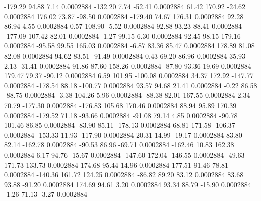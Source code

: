      -179.29       94.88        7.14     0.0002884
     -132.20        7.74      -52.41     0.0002884
       61.42      170.92      -24.62     0.0002884
      176.02       73.87      -98.50     0.0002884
     -179.40       74.67      176.31     0.0002884
       92.28       86.94        4.55     0.0002884
        0.57      108.90       -5.52     0.0002884
       92.88       93.23       88.41     0.0002884
     -177.09      107.42       82.01     0.0002884
       -1.27       99.15        6.30     0.0002884
       92.45       98.15      179.16     0.0002884
      -95.58       99.55      165.03     0.0002884
       -6.87       83.36       85.47     0.0002884
      178.89       81.08       82.08     0.0002884
       94.62       83.51      -91.49     0.0002884
        0.43       69.20       86.96     0.0002884
       35.93        2.13      -31.41     0.0002884
       91.86       87.60      158.26     0.0002884
      -87.80       93.36       19.69     0.0002884
      179.47       79.37      -90.12     0.0002884
        6.59      101.95     -100.08     0.0002884
       34.37      172.92     -147.77     0.0002884
     -178.54       88.18     -100.77     0.0002884
       93.57       94.68       21.41     0.0002884
       -0.22       86.58      -88.75     0.0002884
       -3.38      104.26        5.96     0.0002884
      -88.38       82.01      167.55     0.0002884
        2.34       70.79     -177.30     0.0002884
     -176.83      105.68      170.46     0.0002884
       88.94       95.89      170.39     0.0002884
     -179.52       71.18      -93.66     0.0002884
      -91.08       79.14        4.85     0.0002884
      -90.78      101.46       86.85     0.0002884
      -83.90       85.11     -178.13     0.0002884
       68.81      171.58     -106.37     0.0002884
     -153.33       11.93     -117.90     0.0002884
       20.31       14.99      -19.17     0.0002884
       83.80       82.14     -162.78     0.0002884
      -90.53       86.96      -69.71     0.0002884
     -162.46       10.83      162.38     0.0002884
        6.17       94.76      -15.67     0.0002884
     -147.60      172.04     -146.55     0.0002884
      -49.63      171.73      133.73     0.0002884
      174.68       95.44       14.96     0.0002884
      177.51       91.46       78.81     0.0002884
     -140.36      161.72      124.25     0.0002884
      -86.82       89.20       83.12     0.0002884
       83.68       93.88      -91.20     0.0002884
      174.69       94.61        3.20     0.0002884
       93.34       88.79      -15.90     0.0002884
       -1.26       71.13       -3.27     0.0002884
